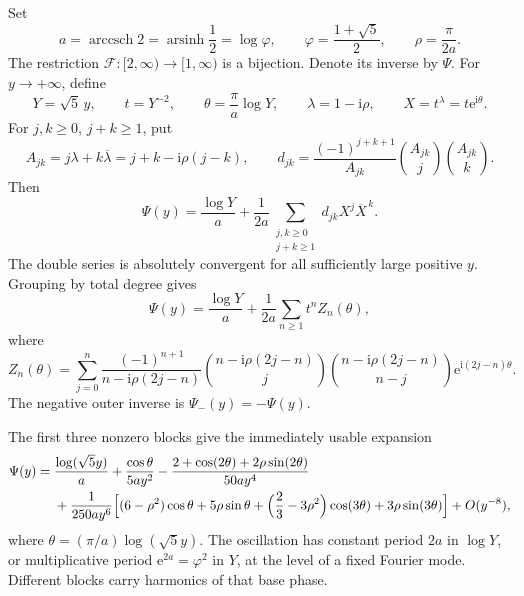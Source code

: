 \documentclass[11pt,oneside]{article}
\theoremstyle{plain}
\theoremstyle{definition}
\theoremstyle{remark}
\newcommand{\e}{\mathrm{e}}
\newcommand{\ii}{\mathrm{i}}
\newcommand{\Fcal}{\mathcal{F}}
\newcommand{\phig}{\varphi}
\newcommand{\arsinh}{\operatorname{arsinh}}
\newcommand{\arccsch}{\operatorname{arccsch}}
\begin{document}
\begin{mainbox}[title={Outer inverse and closed all-orders expansion}]
Set
\begin{equation}
 a=\arccsch 2=\arsinh\frac12=\log\phig,
 \qquad \phig=\frac{1+\sqrt5}{2},
 \qquad \rho=\frac{\pi}{2a}.
 \label{eq:a-rho}
\end{equation}
The restriction \(\Fcal:[2,\infty)\to[1,\infty)\) is a bijection.  Denote its
inverse by \(\Psi\).  For \(y\to+\infty\), define
\begin{equation}
 Y=\sqrt5\,y,\qquad t=Y^{-2},\qquad
 \theta=\frac{\pi}{a}\log Y,
 \qquad \lambda=1-\ii\rho,
 \qquad X=t^\lambda=t\e^{\ii\theta}.
 \label{eq:scaled-variables}
\end{equation}
For \(j,k\ge0\), \(j+k\ge1\), put
\begin{equation}
 A_{jk}=j\lambda+k\overline\lambda
       =j+k-\ii\rho(j-k),
 \qquad
 d_{jk}=\frac{(-1)^{j+k+1}}{A_{jk}}
        \binom{A_{jk}}{j}\binom{A_{jk}}{k}.
 \label{eq:djk}
\end{equation}
Then
\begin{equation}
 \boxed{
 \Psi(y)=\frac{\log Y}{a}
 +\frac1{2a}\sum_{\substack{j,k\ge0\\j+k\ge1}}
 d_{jk}X^j\overline X^{\,k}.}
 \label{eq:main-double}
\end{equation}
The double series is absolutely convergent for all sufficiently large positive
\(y\).  Grouping by total degree gives
\begin{equation}
 \boxed{
 \Psi(y)=\frac{\log Y}{a}
 +\frac1{2a}\sum_{n\ge1}t^nZ_n(\theta),}
 \label{eq:main-block}
\end{equation}
where
\begin{equation}
 Z_n(\theta)=\sum_{j=0}^{n}
 \frac{(-1)^{n+1}}{n-\ii\rho(2j-n)}
 \binom{n-\ii\rho(2j-n)}{j}
 \binom{n-\ii\rho(2j-n)}{n-j}
 \e^{\ii(2j-n)\theta}.
 \label{eq:Zn-closed}
\end{equation}
The negative outer inverse is \(\Psi_-(y)=-\Psi(y)\).
\end{mainbox}

The first three nonzero blocks give the immediately usable expansion
\begin{align}
 \Psi(y)={}&\frac{\log(\sqrt5y)}a
 +\frac{\cos\theta}{5ay^2}
 -\frac{2+\cos(2\theta)+2\rho\sin(2\theta)}{50ay^4}
 \notag\\
 &+\frac1{250ay^6}\Bigl[
 (6-\rho^2)\cos\theta+5\rho\sin\theta
 +\Bigl(\frac23-3\rho^2\Bigr)\cos(3\theta)
 +3\rho\sin(3\theta)\Bigr]
 +O(y^{-8}),
 \label{eq:first-usable}
\end{align}
where \(\theta=(\pi/a)\log(\sqrt5y)\).  The oscillation has constant period
\(2a\) in \(\log Y\), or multiplicative period \(\e^{2a}=\phig^2\) in
\(Y\), at the level of a fixed Fourier mode.  Different blocks carry
harmonics of that base phase.
\end{document}
